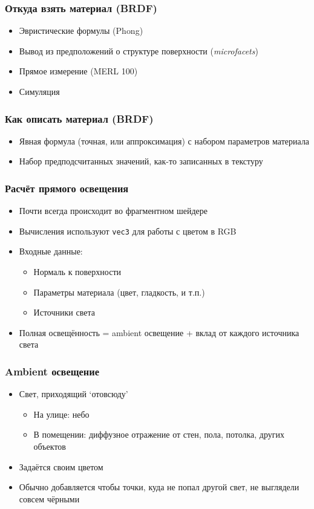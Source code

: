 \documentclass[10pt]{beamer}
\begin{document}
\begin{frame}[fragile]
\frametitle{Откуда взять материал (BRDF)}
\begin{itemize}
\item Эвристические формулы (Phong)
\pause
\item Вывод из предположений о структуре поверхности (\textit{microfacets})
\pause
\item Прямое измерение (MERL 100)
\pause
\item Симуляция
\end{itemize}
\end{frame}

\begin{frame}[fragile]
\frametitle{Как описать материал (BRDF)}
\begin{itemize}
\item Явная формула (точная, или аппроксимация) с набором параметров материала
\pause
\item Набор предподсчитанных значений, как-то записанных в текстуру
\end{itemize}
\end{frame}

\begin{frame}[fragile]
\frametitle{Расчёт прямого освещения}
\begin{itemize}
\item Почти всегда происходит во фрагментном шейдере
\pause
\item Вычисления используют \verb|vec3| для работы с цветом в {\color{red}R}{\color{green}G}{\color{blue}B}
\pause
\item Входные данные:
\pause
\begin{itemize}
\item Нормаль к поверхности
\pause
\item Параметры материала (цвет, гладкость, и т.п.)
\pause
\item Источники света
\end{itemize}
\pause
\item Полная освещённость = ambient освещение + вклад от каждого источника света
\end{itemize}
\end{frame}

\begin{frame}[fragile]
\frametitle{Ambient освещение}
\begin{itemize}
\item Свет, приходящий `отовсюду'
\pause
\begin{itemize}
\item На улице: небо
\pause
\item В помещении: диффузное отражение от стен, пола, потолка, других объектов
\end{itemize}
\pause
\item Задаётся своим цветом
\pause
\item Обычно добавляется чтобы точки, куда не попал другой свет, не выглядели совсем чёрными
\end{itemize}
\end{frame}
\end{document}
